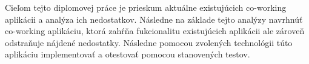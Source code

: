 Cieľom tejto diplomovej práce je prieskum aktuálne existujúcich co-working aplikácii a analýza ich nedostatkov. Následne na základe tejto analýzy navrhnúť co-working aplikáciu, ktorá zahŕňa fukcionalitu existujúcich aplikácii ale zároveň odstraňuje nájdené nedostatky. Následne pomocou zvolených technológii túto aplikáciu implementovať a otestovať pomocou stanovených testov.